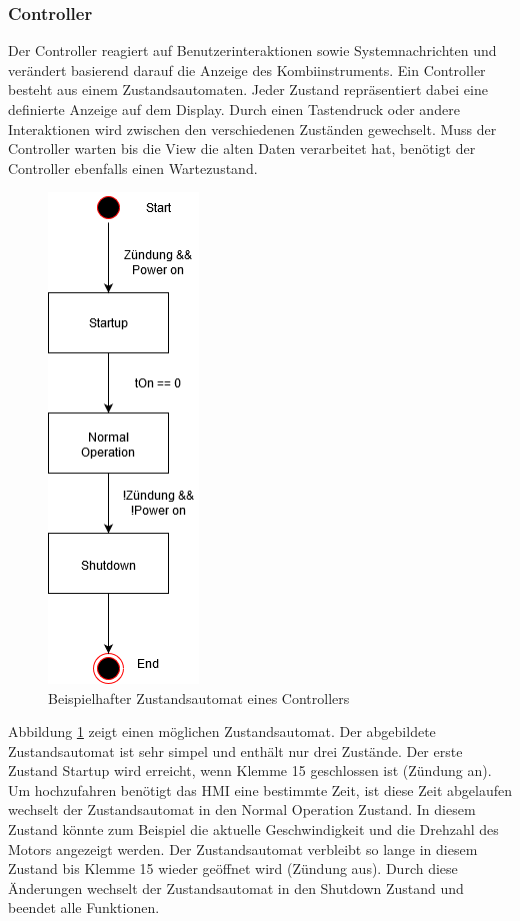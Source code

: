 \subsubsection{Controller}
Der Controller reagiert auf Benutzerinteraktionen sowie Systemnachrichten und verändert basierend darauf die Anzeige des Kombiinstruments. Ein Controller besteht aus einem Zustandsautomaten. Jeder Zustand repräsentiert dabei eine definierte Anzeige auf dem Display. Durch einen Tastendruck oder andere Interaktionen wird zwischen den verschiedenen Zuständen gewechselt. Muss der Controller warten bis die View die alten Daten verarbeitet hat, benötigt der Controller ebenfalls einen Wartezustand.\\

\begin{figure}[htb]
	\centering
	\includegraphics[width=4cm]{img/2_stand_der_technik/simple_statemachine}
	\caption{Beispielhafter Zustandsautomat eines Controllers}
	\label{fig:state}
\end{figure}

Abbildung \ref{fig:state} zeigt einen möglichen Zustandsautomat. Der abgebildete Zustandsautomat ist sehr simpel und enthält nur drei Zustände. Der erste Zustand \glqq Startup\grqq{} wird erreicht, wenn Klemme 15 geschlossen ist (Zündung an). Um hochzufahren benötigt das \ac{HMI} eine bestimmte Zeit, ist diese Zeit abgelaufen wechselt der Zustandsautomat in den \glqq Normal Operation\grqq{} Zustand. In diesem Zustand könnte zum Beispiel die aktuelle Geschwindigkeit und die Drehzahl des Motors angezeigt werden. Der Zustandsautomat verbleibt so lange in diesem Zustand bis Klemme 15 wieder geöffnet wird (Zündung aus). Durch diese Änderungen wechselt der Zustandsautomat in den \glqq Shutdown\grqq{} Zustand und beendet alle Funktionen.\\

